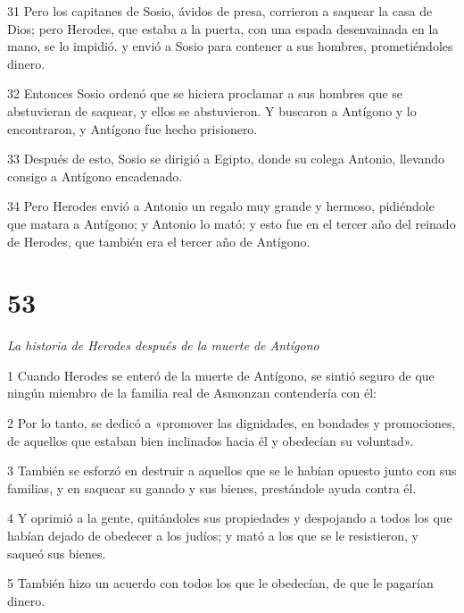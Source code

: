\par 31 Pero los capitanes de Sosio, ávidos de presa, corrieron a saquear la casa de Dios; pero Herodes, que estaba a la puerta, con una espada desenvainada en la mano, se lo impidió. y envió a Sosio para contener a sus hombres, prometiéndoles dinero.

\par 32 Entonces Sosio ordenó que se hiciera proclamar a sus hombres que se abstuvieran de saquear, y ellos se abstuvieron. Y buscaron a Antígono y lo encontraron, y Antígono fue hecho prisionero.

\par 33 Después de esto, Sosio se dirigió a Egipto, donde su colega Antonio, llevando consigo a Antígono encadenado.

\par 34 Pero Herodes envió a Antonio un regalo muy grande y hermoso, pidiéndole que matara a Antígono; y Antonio lo mató; y esto fue en el tercer año del reinado de Herodes, que también era el tercer año de Antígono.

\chapter{53}

\par \textit{La historia de Herodes después de la muerte de Antígono}

\par 1 Cuando Herodes se enteró de la muerte de Antígono, se sintió seguro de que ningún miembro de la familia real de Asmonzan contendería con él:

\par 2 Por lo tanto, se dedicó a «promover las dignidades, en bondades y promociones, de aquellos que estaban bien inclinados hacia él y obedecían su voluntad».

\par 3 También se esforzó en destruir a aquellos que se le habían opuesto junto con sus familias, y en saquear su ganado y sus bienes, prestándole ayuda contra él.

\par 4 Y oprimió a la gente, quitándoles sus propiedades y despojando a todos los que habían dejado de obedecer a los judíos; y mató a los que se le resistieron, y saqueó sus bienes.

\par 5 También hizo un acuerdo con todos los que le obedecían, de que le pagarían dinero.

